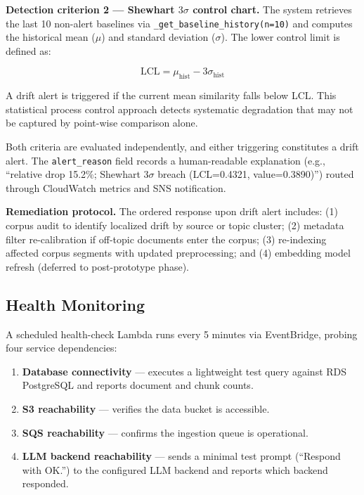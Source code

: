 \documentclass[12pt,a4paper]{report}
\begin{document}
\textbf{Detection criterion 2 --- Shewhart $3\sigma$ control chart.} The system retrieves the last 10 non-alert baselines via \texttt{\_get\_baseline\_history(n=10)} and computes the historical mean ($\mu$) and standard deviation ($\sigma$). The lower control limit is defined as:

\begin{equation}
  \text{LCL} = \mu_{\text{hist}} - 3\sigma_{\text{hist}}
  \label{eq:shewhart}
\end{equation}

A drift alert is triggered if the current mean similarity falls below LCL. This statistical process control approach detects systematic degradation that may not be captured by point-wise comparison alone.

Both criteria are evaluated independently, and either triggering constitutes a drift alert. The \texttt{alert\_reason} field records a human-readable explanation (e.g., ``relative drop 15.2\%; Shewhart $3\sigma$ breach (LCL=0.4321, value=0.3890)'') routed through CloudWatch metrics and SNS notification.

\textbf{Remediation protocol.} The ordered response upon drift alert includes: (1) corpus audit to identify localized drift by source or topic cluster; (2) metadata filter re-calibration if off-topic documents enter the corpus; (3) re-indexing affected corpus segments with updated preprocessing; and (4) embedding model refresh (deferred to post-prototype phase).

\subsection{Health Monitoring}

A scheduled health-check Lambda runs every 5 minutes via EventBridge, probing four service dependencies:

\begin{enumerate}[leftmargin=0.5in]
  \item \textbf{Database connectivity} --- executes a lightweight test query against RDS PostgreSQL and reports document and chunk counts.
  \item \textbf{S3 reachability} --- verifies the data bucket is accessible.
  \item \textbf{SQS reachability} --- confirms the ingestion queue is operational.
  \item \textbf{LLM backend reachability} --- sends a minimal test prompt (``Respond with OK.'') to the configured LLM backend and reports which backend responded.
\end{enumerate}
\end{document}
